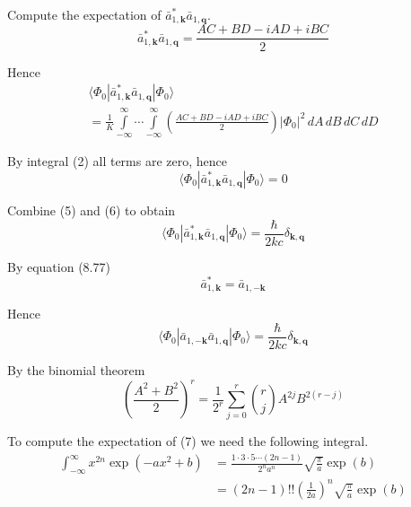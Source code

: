 Compute the expectation of $\bar a_{1,\mathbf k}^*\bar a_{1,\mathbf q}$.
\begin{equation*}
\bar a_{1,\mathbf k}^*\bar a_{1,\mathbf q}
=\frac{AC+BD-iAD+iBC}{2}
\end{equation*}

Hence
\begin{multline*}
\langle\Phi_0|\bar a_{1,\mathbf k}^*\bar a_{1,\mathbf q}|\Phi_0\rangle
\\
{}=
\frac{1}{K}\int\limits_{-\infty}^\infty\cdots\int\limits_{-\infty}^\infty
\left(\frac{AC+BD-iAD+iBC}{2}\right)
\vert\Phi_0\vert^2\,dA\,dB\,dC\,dD
\end{multline*}

By integral (2) all terms are zero, hence
\begin{equation*}
\langle\Phi_0|\bar a_{1,\mathbf k}^*\bar a_{1,\mathbf q}|\Phi_0\rangle=0
\tag{6}
\end{equation*}

Combine (5) and (6) to obtain
\begin{equation*}
\langle\Phi_0|\bar a_{1,\mathbf k}^*\bar a_{1,\mathbf q}|\Phi_0\rangle=\frac{\hbar}{2kc}\delta_{\mathbf k,\mathbf q}
\end{equation*}

By equation (8.77)
\begin{equation*}
\bar a_{1,\mathbf k}^*=\bar a_{1,-\mathbf k}
\end{equation*}

Hence
\begin{equation*}
\langle\Phi_0|\bar a_{1,-\mathbf k}\bar a_{1,\mathbf q}|\Phi_0\rangle=\frac{\hbar}{2kc}\delta_{\mathbf k,\mathbf q}
\end{equation*}


By the binomial theorem
\begin{equation*}
\left(\frac{A^2+B^2}{2}\right)^r=\frac{1}{2^r}\sum_{j=0}^r\binom{r}{j}A^{2j}B^{2(r-j)}
\tag{7}
\end{equation*}

To compute the expectation of (7) we need the following integral.
\begin{align*}
\int_{-\infty}^\infty x^{2n}\exp(-ax^2+b)
&=\frac{1\cdot3\cdot5\cdots(2n-1)}{2^na^n}\sqrt{\frac{\pi}{a}}\exp(b)
\\
&=(2n-1)!!
\left(\frac{1}{2a}\right)^n
\sqrt{\frac{\pi}{a}}\exp(b)
\tag{8}
\end{align*}

